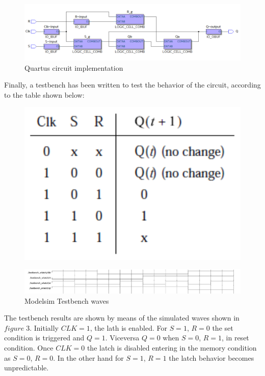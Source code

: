 \documentclass[12pt]{article}
\begin{document}
\begin{figure}[h]
	\centering
	\includegraphics[scale = 0.6]{immagini/postmap.PNG}
	\caption{Quartus circuit implementation}
\end{figure}
\vspace{5mm}
\newpage
Finally, a testbench has been written to test the behavior of the circuit, according to the table shown below:
\vspace{5mm}
\begin{figure}[h]
	\centering
	\includegraphics[scale = 0.6]{immagini/table_sr.PNG}		
\end{figure}


\begin{figure}[h]
	\centering
	\includegraphics[scale = 0.45]{immagini/testbench1.PNG}
	\caption{Modelsim Testbench waves}
\end{figure}
The testbench results are shown by means of the simulated waves shown in $figure\;3$. 
Initially $CLK=1$, the lath is enabled. For $S=1$, $R=0$ the set condition is triggered and $Q=1$. Viceversa $Q=0$ when $S=0$, $R=1$, in reset condition. Once $CLK=0$ the latch is disabled entering in the memory condition as $S=0$, $R=0$. In the other hand for $S=1$, $R=1$ the latch behavior becomes unpredictable.
\vspace{10mm}
\newpage
\end{document}
